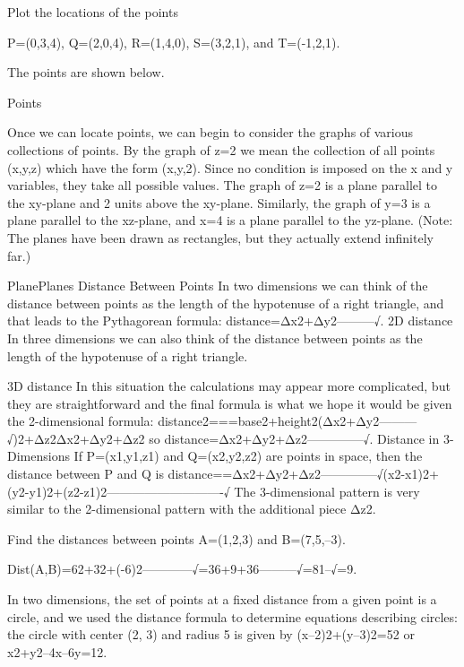 \begin{example}
Plot the locations of the points

P=(0,3,4),
Q=(2,0,4),
R=(1,4,0),
S=(3,2,1), and
T=(-1,2,1).

\begin{solution} The points are shown below.

Points
\end{solution}\end{example}

Once we can locate points, we can begin to consider the graphs of various collections of points. By the graph of z=2 we mean the collection of all points (x,y,z) which have the form (x,y,2). Since no condition is imposed on the x and y variables, they take all possible values. The graph of z=2 is a plane parallel to the xy-plane and 2 units above the xy-plane. Similarly, the graph of y=3 is a plane parallel to the xz-plane, and x=4 is a plane parallel to the yz-plane. (Note: The planes have been drawn as rectangles, but they actually extend infinitely far.)

PlanePlanes
Distance Between Points
In two dimensions we can think of the distance between points as the length of the hypotenuse of a right triangle, and that leads to the Pythagorean formula:
distance=Δx2+Δy2---------√.
2D distance
In three dimensions we can also think of the distance between points as the length of the hypotenuse of a right triangle.

3D distance
In this situation the calculations may appear more complicated, but they are straightforward and the final formula is what we hope it would be given the 2-dimensional formula:
distance2===base2+height2(Δx2+Δy2---------√)2+Δz2Δx2+Δy2+Δz2
so
distance=Δx2+Δy2+Δz2--------------√.
Distance in 3-Dimensions
If P=(x1,y1,z1) and Q=(x2,y2,z2) are points in space, then the distance between P and Q is
distance==Δx2+Δy2+Δz2--------------√(x2-x1)2+(y2-y1)2+(z2-z1)2----------------------------√
The 3-dimensional pattern is very similar to the 2-dimensional pattern with the additional piece Δz2.

\begin{example}
Find the distances between points A=(1,2,3) and B=(7,5,–3).

\begin{solution}
  Dist(A,B)=62+32+(-6)2------------√=36+9+36---------√=81--√=9.
\end{solution}\end{example}

In two dimensions, the set of points at a fixed distance from a given point is a circle, and we used the distance formula to determine equations describing circles: the circle with center (2, 3) and radius 5 is given by (x–2)2+(y–3)2=52 or x2+y2–4x–6y=12.


